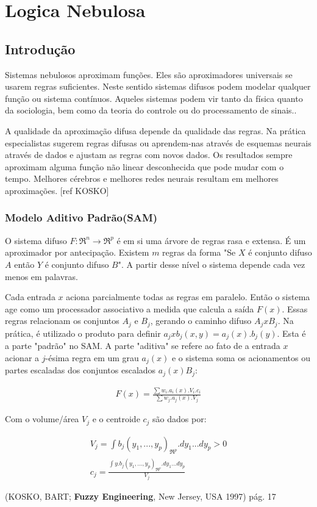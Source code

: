 \section{Logica Nebulosa}

\subsection{Introdução}

Sistemas nebulosos aproximam funções. Eles são aproximadores universais se usarem regras suficientes. 
Neste sentido sistemas difusos podem modelar qualquer função ou sistema contínuos. Aqueles sistemas 
podem vir tanto da física quanto da sociologia, bem como da teoria do controle ou do 
processamento de sinais.\cite{kosko1997fuzzy}.

A qualidade da aproximação difusa depende da qualidade das regras. Na prática especialistas sugerem regras
difusas ou aprendem-nas através de esquemas neurais através de dados e ajustam as regras com novos dados.
Os resultados sempre aproximam alguma função não linear desconhecida que pode mudar com o tempo. Melhores 
cérebros e melhores redes neurais resultam em melhores aproximações. [ref KOSKO]

\subsubsection{Modelo Aditivo Padrão(SAM)}

O sistema difuso $F:\Re^n \rightarrow \Re^p$ é em si uma árvore de regras rasa e extensa. É um aproximador
por antecipação. Existem $m$ regras da forma "Se $X$ é conjunto difuso $A$ então $Y$ é conjunto difuso $B$".
A partir desse nível o sistema depende cada vez menos em palavras. 

Cada entrada $x$ aciona parcialmente todas as regras em paralelo. Então o sistema age como um processador 
associativo a medida que calcula a saída
$F(x)$. 
Essas regras relacionam os conjuntos $A_j$ e $B_j$, gerando o caminho difuso $A_j x B_j$. Na prática,
é utilizado o produto para definir $ a_j x b_j (x,y) = a_j(x).b_j(y)$. Esta é a parte "padrão" no SAM.
A parte "aditiva" se refere ao fato de a entrada $x$ acionar a $j$-ésima regra em um grau $a_j(x)$ e o sistema 
soma os acionamentos ou partes escaladas dos conjuntos escalados $a_j(x)B_j$:

\begin{eqnarray}
F(x) = \frac{\sum w_i.a_i(x).V_i.c_i}{\sum w_j.a_j(x).V_j}
\end{eqnarray}

Com o volume/área $V_j$ e o centroide $c_j$ são dados por:

\begin{eqnarray}
V_j = \int{b_j(y_1,...,y_p)}_{\Re^{p}}.dy_1...dy_p > 0\\
c_j = \frac{\int{y.b_j(y_1,...,y_p)}_{\Re^{p}}.dy_1...dy_p}{V_j}
\end{eqnarray}

(KOSKO, BART; \textbf{Fuzzy Engineering}, New Jersey, USA 1997) pág. 17
